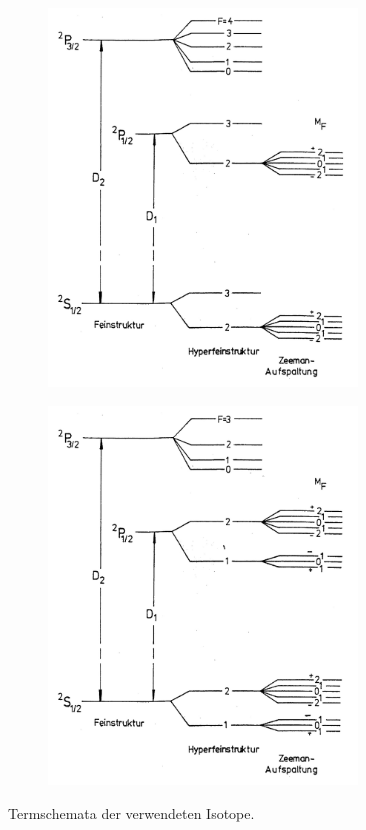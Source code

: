 \documentclass[bigchapter,colorback,accentcolor=tud4b,linedtoc,11pt]{tudreport}
\begin{document}
\begin{figure}[H]
\begin{subfigure}[c]{0.52\textwidth}

\includegraphics[width=0.9\textwidth]{img/Rb-85.jpg}

\end{subfigure}
\begin{subfigure}[c]{0.52\textwidth}
\includegraphics[width=0.9\textwidth]{img/Rb-87.jpg}
\end{subfigure}
\caption{Termschemata der verwendeten Isotope.}
\end{figure}
\end{document}
